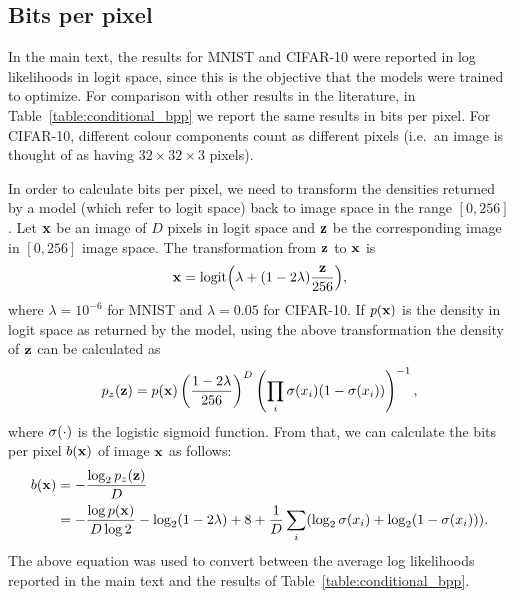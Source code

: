 \subsection{Bits per pixel}

In the main text, the results for MNIST and CIFAR-10 were reported in log likelihoods in logit space, since this is the objective that the models were trained to optimize. For comparison with other results in the literature, in Table~\ref{table:conditional_bpp} we report the same results in bits per pixel. For CIFAR-10, different colour components count as different pixels (i.e.~an image is thought of as having $32\!\times\! 32 \!\times\! 3$ pixels).

In order to calculate bits per pixel, we need to transform the densities returned by a model (which refer to logit space) back to image space in the range $\left[0, 256\right]$. Let $\mathbf{x}$ be an image of $D$ pixels in logit space and $\mathbf{z}$ be the corresponding image in $\left[0, 256\right]$ image space. The transformation from $\mathbf{z}$ to $\mathbf{x}$ is
\begin{equation}
\mathbf{x} = \operatorname{logit}\mathopen{}\left(\lambda + \mathopen{}\left(1-2\lambda\right)\mathclose{}\frac{\mathbf{z}}{256}\right)\mathclose{},
\end{equation}
where $\lambda\!=\!10^{-6}$ for MNIST and $\lambda\!=\!0.05$ for CIFAR-10. If $p\mathopen{}\left(\mathbf{x}\right)\mathclose{}$ is the density in logit space as returned by the model, using the above transformation the density of $\mathbf{z}$ can be calculated as
\begin{equation}
p_z\mathopen{}\left(\mathbf{z}\right)\mathclose{} = p\mathopen{}\left(\mathbf{x}\right)\mathclose{}\left(\frac{1-2\lambda}{256}\right)^D\left(\prod_i\sigma\mathopen{}\left(x_i\right)\mathclose{}\mathopen{}\left(1-\sigma\mathopen{}\left(x_i\right)\mathclose{}\right)\mathclose{}\right)^{-1},
\end{equation}
where $\sigma\mathopen{}\left(\cdot\right)\mathclose{}$ is the logistic sigmoid function. From that, we can calculate the bits per pixel $b\mathopen{}\left(\mathbf{x}\right)\mathclose{}$ of image $\mathbf{x}$ as follows:
\begin{align}
b\mathopen{}\left(\mathbf{x}\right)\mathclose{} &= -\frac{\log_2{p_z\mathopen{}\left(\mathbf{z}\right)\mathclose{}}}{D} \\
&= -\frac{\log{p\mathopen{}\left(\mathbf{x}\right)\mathclose{}}}{D\log{2}} - \log_2\mathopen{}\left(1-2\lambda\right)\mathclose{} + 8 + \frac{1}{D}\sum_i\mathopen{}\left(\log_2{\sigma\mathopen{}\left(x_i\right)\mathclose{}} + \log_2\mathopen{}\left(1 - \sigma\mathopen{}\left(x_i\right)\mathclose{}\right)\mathclose{}\right)\mathclose{}.
\end{align}
The above equation was used to convert between the average log likelihoods reported in the main text and the results of Table~\ref{table:conditional_bpp}.


